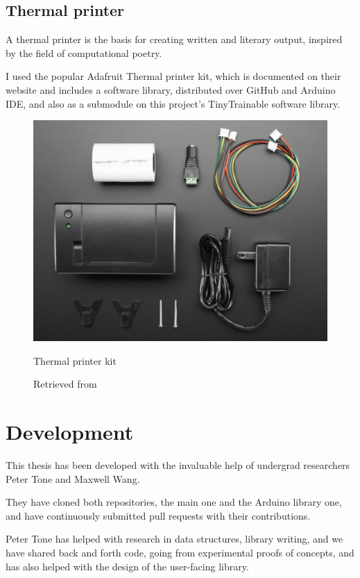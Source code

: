 \subsection{Thermal printer}

A thermal printer is the basis for creating written and literary output, inspired by the field of computational poetry.

I used the popular Adafruit Thermal printer kit, which is documented on their website and includes a software library, distributed over GitHub and Arduino IDE, and also as a submodule on this project's TinyTrainable software library.

\begin{figure}[ht]
  \centering
  \includegraphics[width=0.75\linewidth,height=0.25\textheight,keepaspectratio]{images/materials-adafruit-thermal-printer.jpg}
  \caption{Thermal printer kit}
  \caption*{Retrieved from \cite{website-materials-adafruit-thermal-printer}}
  \label{fig:materials-adafruit-thermal-printer}
\end{figure}

\section{Development}

This thesis has been developed with the invaluable help of undergrad researchers Peter Tone and Maxwell Wang.

They have cloned both repositories, the main one and the Arduino library one, and have continuously submitted pull requests with their contributions.

Peter Tone has helped with research in data structures, library writing, and we have shared back and forth code, going from experimental proofs of concepts, and has also helped with the design of the user-facing library.

